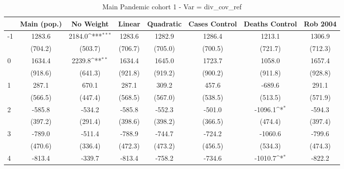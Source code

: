 \documentclass{article}
\begin{document}
{
\def\sym#1{\ifmmode^{#1}\else\(^{#1}\)\fi}
\begin{longtable}{l*{7}{c}}
\caption{Main Pandemic cohort 1 - Var = div\_cov\_ref}\\
\hline\hline\endfirsthead\hline\endhead\hline\endfoot\endlastfoot
                &\multicolumn{1}{c}{Main (pop.)}&\multicolumn{1}{c}{No Weight}&\multicolumn{1}{c}{Linear}&\multicolumn{1}{c}{Quadratic}&\multicolumn{1}{c}{Cases Control}&\multicolumn{1}{c}{Deaths Control}&\multicolumn{1}{c}{Rob 2004}\\
\hline
-1              &   1283.6         &   2184.0\sym{***}&   1283.6         &   1282.9         &   1286.4         &   1213.1         &   1306.9         \\
                &  (704.2)         &  (503.7)         &  (706.7)         &  (705.0)         &  (700.5)         &  (721.7)         &  (712.3)         \\
0               &   1634.4         &   2239.8\sym{**} &   1634.4         &   1645.0         &   1723.7         &   1058.0         &   1657.4         \\
                &  (918.6)         &  (641.3)         &  (921.8)         &  (919.2)         &  (900.2)         &  (911.8)         &  (928.8)         \\
1               &    287.1         &    670.1         &    287.1         &    309.2         &    457.6         &   -689.6         &    291.1         \\
                &  (566.5)         &  (447.4)         &  (568.5)         &  (567.0)         &  (538.5)         &  (513.5)         &  (571.9)         \\
2               &   -585.8         &   -534.2         &   -585.8         &   -552.3         &   -501.0         &  -1096.1\sym{*}  &   -594.3         \\
                &  (397.2)         &  (291.4)         &  (398.6)         &  (398.2)         &  (366.5)         &  (474.4)         &  (397.4)         \\
3               &   -789.0         &   -511.4         &   -788.9         &   -744.7         &   -724.2         &  -1060.6         &   -799.6         \\
                &  (470.6)         &  (336.4)         &  (472.3)         &  (473.2)         &  (456.5)         &  (534.3)         &  (474.3)         \\
4               &   -813.4         &   -339.7         &   -813.4         &   -758.2         &   -734.6         &  -1010.7\sym{*}  &   -822.2         \\

\end{longtable}}
\end{document}
